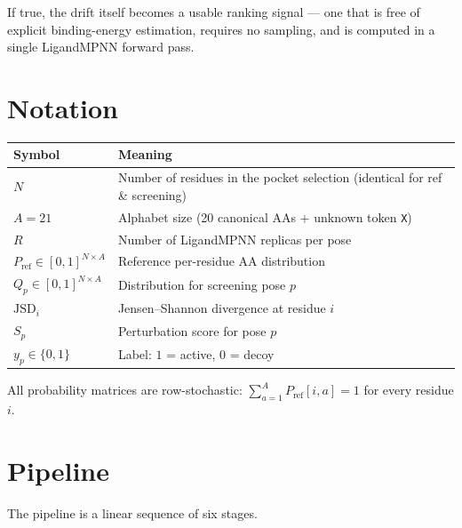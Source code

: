 \documentclass[11pt]{article}
\newcommand{\jsd}{\mathrm{JSD}}
\begin{document}
If true, the drift itself becomes a usable ranking signal --- one that is
free of explicit binding-energy estimation, requires no sampling, and is
computed in a single LigandMPNN forward pass.

\section{Notation}

\begin{tabular}{ll}
\toprule
Symbol & Meaning \\
\midrule
$N$ & Number of residues in the pocket selection (identical for ref \& screening)\\
$A=21$ & Alphabet size (20 canonical AAs + unknown token \texttt{X})\\
$R$ & Number of LigandMPNN replicas per pose \\
$P_{\mathrm{ref}}\in [0,1]^{N\times A}$ & Reference per-residue AA distribution \\
$Q_p\in [0,1]^{N\times A}$ & Distribution for screening pose $p$ \\
$\jsd_i$ & Jensen--Shannon divergence at residue $i$ \\
$S_p$ & Perturbation score for pose $p$ \\
$y_p \in \{0,1\}$ & Label: $1$ = active, $0$ = decoy \\
\bottomrule
\end{tabular}

All probability matrices are row-stochastic:
$\sum_{a=1}^{A} P_{\mathrm{ref}}[i,a] = 1$ for every residue $i$.

\section{Pipeline}

The pipeline is a linear sequence of six stages.
\end{document}
